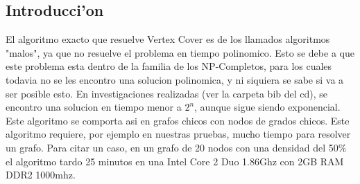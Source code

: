 \subsection{Introducci'on}
El algoritmo exacto que resuelve Vertex Cover es de los llamados algoritmos "malos", ya que no resuelve el problema en tiempo polinomico. Esto se debe a que este problema esta dentro de la familia de los NP-Completos, para los cuales todavia no se les encontro una solucion polinomica, y ni siquiera se sabe si va a ser posible esto.
En investigaciones realizadas (ver la carpeta bib del cd), se encontro una solucion en tiempo menor a $2^n$, aunque sigue siendo exponencial. Este algoritmo se comporta asi en grafos chicos con nodos de grados chicos. 
Este algoritmo requiere, por ejemplo en nuestras pruebas, mucho tiempo para resolver un grafo. Para citar un caso, en un grafo de 20 nodos con una densidad del 50\% el algoritmo tardo 25 minutos en una Intel Core 2 Duo 1.86Ghz con 2GB RAM DDR2 1000mhz.
